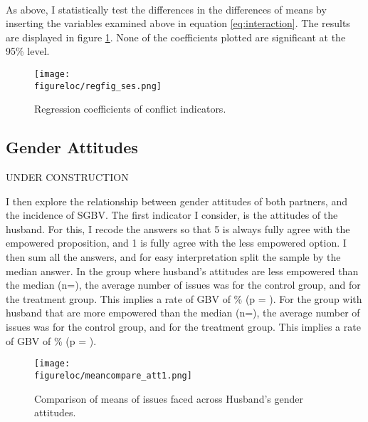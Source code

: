 \documentclass[11pt,a4paper]{scrartcl} %
\newcommand{\figureloc}{C:/Users/Koen/Dropbox/PhD/Papers/CongoGBV/Figures}
\begin{document}
\paragraph{}
As above, I statistically test the differences in the differences of means by inserting the variables examined above in equation \ref{eq:interaction}. The results are displayed in figure \ref{fig:regfig_ses}. None of the coefficients plotted are significant at the 95\% level.

\begin{figure}[H]
  \texttt{[image: \\figureloc/regfig\_ses.png]}
  \caption{Regression coefficients of conflict indicators.}
  \label{fig:regfig_ses}
\end{figure}


\subsection*{Gender Attitudes}
UNDER CONSTRUCTION


I then explore the relationship between gender attitudes of both partners, and the incidence of SGBV. The first indicator I consider, is the attitudes of the husband. For this, I recode the answers so that 5 is always fully agree with the empowered proposition, and 1 is fully agree with the less empowered option. I then sum all the answers, and for easy interpretation split the sample by the median answer. In the group where husband's attitudes are less empowered than the median (n=), the average number of issues was  for the control group, and  for the treatment group. This implies a rate of GBV of \% (p = ). For the group with husband that are more empowered than the median (n=), the average number of issues was  for the control group, and  for the treatment group. This implies a rate of GBV of \% (p = ).

\begin{figure}[H]
  \texttt{[image: \\figureloc/meancompare\_att1.png]}
  \caption{Comparison of means of issues faced across Husband's gender attitudes.}
  \label{fig:meancompare_att1}
\end{figure}
\end{document}
